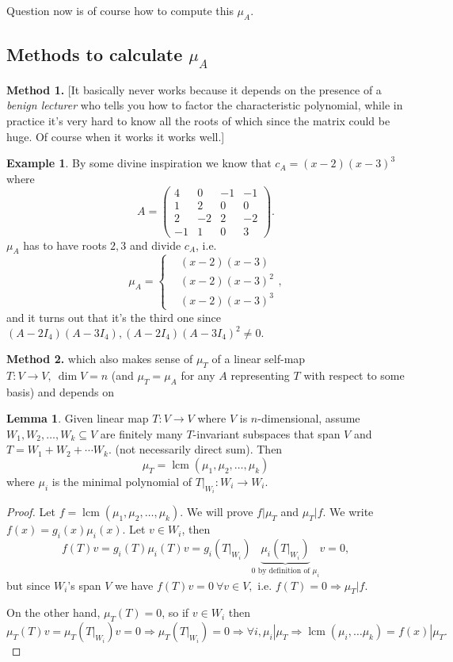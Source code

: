 \documentclass[a4paper]{article}
\newcommand{\lcm}{\operatorname{lcm}}
\theoremstyle{definition}
\newtheorem{lemma}[defn]{Lemma}
\newtheorem{example}[defn]{Example}
\begin{document}
Question now is of course how to compute this $\mu_{A}$.

\subsection{Methods to calculate $\mu_{A}$}

\textbf{Method 1.} [It basically never works because it depends on the presence of a \textit{benign lecturer} who tells you how to factor the characteristic polynomial, while in practice it's very hard to know all the roots of which since the matrix could be huge. Of course when it works it works well.]

\begin{example}
	By some divine inspiration we know that $c_{A}=(x-2)(x-3)^3$ where
\[
A=\begin{pmatrix}
		4 & 0 & -1 & -1 \\ 1 & 2 & 0 & 0 \\ 2 & -2 & 2 & -2 \\ -1 & 1 & 0 & 3
	\end{pmatrix} .
\]
$\mu_{A}$ has to have roots $2,3$ and divide $c_{A}$, i.e.
\[
\mu_{A}=\left\{ \begin{aligned}
		&(x-2)(x-3) \\ &(x-2)(x-3)^2 \\ &(x-2)(x-3)^3
	\end{aligned} \right. ,
\]
and it turns out that it's the third one since $(A-2I_4)(A-3I_4),(A-2I_4)(A-3I_4)^2 \neq 0 .$
\end{example}

\textbf{Method 2.} which also makes sense of $\mu_T$ of a linear self-map $T:V\rightarrow V, \ \dim V=n$ (and $\mu_T=\mu_{A}$ for any $A$ representing $T$ with respect to some basis) and depends on
\begin{lemma}
	Given linear map $T:V\rightarrow V$ where $V$ is $n$-dimensional, assume $W_1,W_2,\ldots,W_k \subseteq V$ are finitely many $T$-invariant subspaces that span $V$ and $T=W_1+W_2+\cdots W_k .$ (not necessarily direct sum). Then
\[
\mu_T=\lcm (\mu_1,\mu_2,\ldots,\mu_k)
\]
where $\mu_i$ is the minimal polynomial of $\left. T \right|_{W_i}: W_i \rightarrow W_i$.
\end{lemma}

\begin{proof}
	Let $f=\lcm (\mu_1,\mu_2,\ldots,\mu_k)$. We will prove $f|\mu_T$ and $\mu_T|f$. We write $f(x)=g_i(x)\mu_i(x)$. Let $v\in W_i$, then
\[
f(T)v=g_i(T)\mu_i(T)v=g_i\left(\left. T\right|_{W_i}\right)\underbrace{\mu_i \left(\left. T\right|_{W_i}\right)}_{0\text{ by definition of }\mu_i}v=0 ,
\]
but since $W_i$'s span $V$ we have $f(T)v=0 \ \forall v\in V ,$ i.e. $f(T)=0 \Rightarrow \mu_T |f$.

	On the other hand, $\mu_T(T)=0$, so if $v\in W_i$ then $\mu_T(T)v=\mu_T\left(\left.T\right|_{W_i}\right)v=0 \Rightarrow \mu_T\left(\left.T\right|_{W_i}\right)=0 \Rightarrow \forall i, \mu_i |\mu_T \Rightarrow \lcm (\mu_i,\ldots \mu_k)=f(x)|\mu_T .$
\end{proof}
\end{document}
